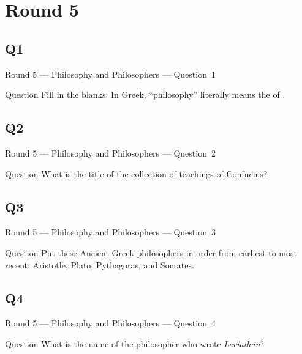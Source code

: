 \documentclass[11pt]{beamer}
\begin{document}
\section{Round 5}
\subsection*{Q1}
\begin{frame}[t]{Round 5 --- Philosophy and Philosophers --- \mbox{Question 1}}
\vspace{-0.5em}
\begin{block}{Question}
Fill in the blanks: In Greek, ``philosophy'' literally means the \textunderscore{}\textunderscore{}\textunderscore{}\textunderscore{}\textunderscore{} of \textunderscore{}\textunderscore{}\textunderscore{}\textunderscore{}\textunderscore{}.
\end{block}
\end{frame}
\subsection*{Q2}
\begin{frame}[t]{Round 5 --- Philosophy and Philosophers --- \mbox{Question 2}}
\vspace{-0.5em}
\begin{block}{Question}
What is the title of the collection of teachings of Confucius?
\end{block}
\end{frame}
\subsection*{Q3}
\begin{frame}[t]{Round 5 --- Philosophy and Philosophers --- \mbox{Question 3}}
\vspace{-0.5em}
\begin{block}{Question}
Put these Ancient Greek philosophers in order from earliest to most recent: Aristotle, Plato, Pythagoras, and Socrates.
\end{block}
\end{frame}
\subsection*{Q4}
\begin{frame}[t]{Round 5 --- Philosophy and Philosophers --- \mbox{Question 4}}
\vspace{-0.5em}
\begin{block}{Question}
What is the name of the  philosopher who wrote \emph{Leviathan}?
\end{block}
\end{frame}
\end{document}
